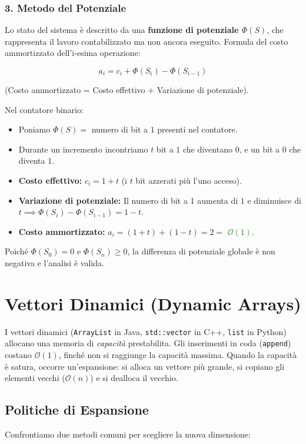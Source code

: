 \documentclass[12pt, a4paper]{article}
\begin{document}
\subsubsection{3. Metodo del Potenziale}
Lo stato del sistema è descritto da una \textbf{funzione di potenziale $\Phi(S)$}, che rappresenta il lavoro contabilizzato ma non ancora eseguito.
Formula del costo ammortizzato dell'i-esima operazione:


$$a_i = c_i + \Phi(S_i) - \Phi(S_{i-1})$$


(Costo ammortizzato = Costo effettivo + Variazione di potenziale).

Nel contatore binario:
\begin{itemize}
\item Poniamo $\Phi(S) =$ numero di bit a $1$ presenti nel contatore.
\item Durante un incremento incontriamo $t$ bit a $1$ che diventano $0$, e un bit a $0$ che diventa $1$.
\item \textbf{Costo effettivo:} $c_i = 1 + t$ (i $t$ bit azzerati più l'uno acceso).
\item \textbf{Variazione di potenziale:} Il numero di bit a 1 aumenta di $1$ e diminuisce di $t \implies \Phi(S_i) - \Phi(S_{i-1}) = 1 - t$.
\item \textbf{Costo ammortizzato:} $a_i = (1 + t) + (1 - t) = 2 =$ \textcolor{green}{$\mathcal{O}(1)$}.
\end{itemize}
Poiché $\Phi(S_0) = 0$ e $\Phi(S_n) \ge 0$, la differenza di potenziale globale è non negativa e l'analisi è valida.

\newpage

\section{Vettori Dinamici (Dynamic Arrays)}

I vettori dinamici (\texttt{ArrayList} in Java, \texttt{std::vector} in C++, \texttt{list} in Python) allocano una memoria di \textit{capacità} prestabilita.
Gli inserimenti in coda (\texttt{append}) costano $\mathcal{O}(1)$, finché non si raggiunge la capacità massima. Quando la capacità è satura, occorre un'espansione: si alloca un vettore più grande, si copiano gli elementi vecchi ($\mathcal{O}(n)$) e si dealloca il vecchio.

\subsection{Politiche di Espansione}
Confrontiamo due metodi comuni per scegliere la nuova dimensione:
\end{document}
